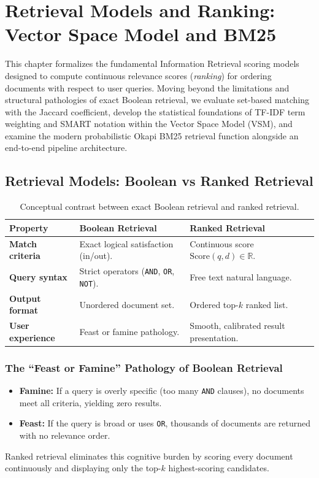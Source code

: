 \chapter{Retrieval Models and Ranking: Vector Space Model and BM25}
\label{chap:retrieval-vsm-bm25-en}

This chapter formalizes the fundamental Information Retrieval scoring models designed to compute continuous relevance scores (\textit{ranking}) for ordering documents with respect to user queries. Moving beyond the limitations and structural pathologies of exact Boolean retrieval, we evaluate set-based matching with the Jaccard coefficient, develop the statistical foundations of TF-IDF term weighting and SMART notation within the Vector Space Model (VSM), and examine the modern probabilistic Okapi BM25 retrieval function alongside an end-to-end pipeline architecture.

\FloatBarrier
\section{Retrieval Models: Boolean vs Ranked Retrieval}
\label{sec:boolean-vs-ranked-en}

\begin{table}[H]
\centering
\small
\begin{tabularx}{\linewidth}{l X X}
\toprule
\textbf{Property} & \textbf{Boolean Retrieval} & \textbf{Ranked Retrieval} \\
\midrule
\textbf{Match criteria} & Exact logical satisfaction (in/out). & Continuous score $\text{Score}(q, d) \in \mathbb{R}$. \\
\addlinespace
\textbf{Query syntax} & Strict operators (\texttt{AND}, \texttt{OR}, \texttt{NOT}). & Free text natural language. \\
\addlinespace
\textbf{Output format} & Unordered document set. & Ordered top-$k$ ranked list. \\
\addlinespace
\textbf{User experience} & Feast or famine pathology. & Smooth, calibrated result presentation. \\
\bottomrule
\end{tabularx}
\caption{Conceptual contrast between exact Boolean retrieval and ranked retrieval.}
\label{tab:bool-vs-ranked-en}
\end{table}

\subsection{The ``Feast or Famine'' Pathology of Boolean Retrieval}
\begin{itemize}
    \item \textbf{Famine:} If a query is overly specific (too many \texttt{AND} clauses), no documents meet all criteria, yielding zero results.
    \item \textbf{Feast:} If the query is broad or uses \texttt{OR}, thousands of documents are returned with no relevance order.
\end{itemize}
Ranked retrieval eliminates this cognitive burden by scoring every document continuously and displaying only the top-$k$ highest-scoring candidates.

